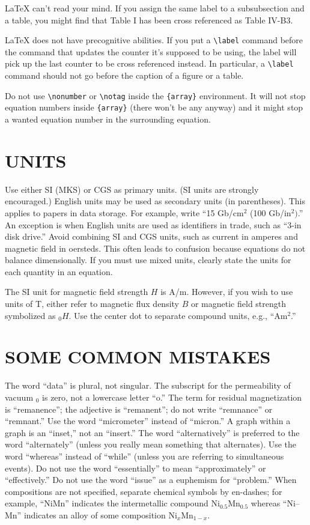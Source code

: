 \documentclass{IEEEoj}
\begin{document}
{\LaTeX} can't read your mind. If you assign the same label to a
subsubsection and a table, you might find that Table I has been cross
referenced as Table IV-B3.

{\LaTeX} does not have precognitive abilities. If you put a
\verb|\label| command before the command that updates the counter it's
supposed to be using, the label will pick up the last counter to be
cross referenced instead. In particular, a \verb|\label| command
should not go before the caption of a figure or a table.

Do not use \verb|\nonumber| or \verb|\notag| inside the \verb|{array}| environment. It
will not stop equation numbers inside \verb|{array}| (there won't be
any anyway) and it might stop a wanted equation number in the
surrounding equation.

\section{UNITS}
Use either SI (MKS) or CGS as primary units. (SI units are strongly 
encouraged.) English units may be used as secondary units (in parentheses). 
This applies to papers in data storage. For example, write ``15 Gb/cm$^{2}$ 
(100 Gb/in$^{2})$.'' An exception is when English units are used as 
identifiers in trade, such as ``3\textonehalf -in disk drive.'' Avoid 
combining SI and CGS units, such as current in amperes and magnetic field in 
oersteds. This often leads to confusion because equations do not balance 
dimensionally. If you must use mixed units, clearly state the units for each 
quantity in an equation.

The SI unit for magnetic field strength $H$ is A/m. However, if you wish to use 
units of T, either refer to magnetic flux density $B$ or magnetic field 
strength symbolized as \textmu $_{0}H$. Use the center dot to separate 
compound units, e.g., ``A\textbullet m$^{2}$.''

\section{SOME COMMON MISTAKES}
The word ``data'' is plural, not singular. The subscript for the 
permeability of vacuum \textmu $_{0}$ is zero, not a lowercase letter ``o.'' 
The term for residual magnetization is ``remanence''; the adjective is 
``remanent''; do not write ``remnance'' or ``remnant.'' Use the word 
``micrometer'' instead of ``micron.'' A graph within a graph is an 
``inset,'' not an ``insert.'' The word ``alternatively'' is preferred to the 
word ``alternately'' (unless you really mean something that alternates). Use 
the word ``whereas'' instead of ``while'' (unless you are referring to 
simultaneous events). Do not use the word ``essentially'' to mean 
``approximately'' or ``effectively.'' Do not use the word ``issue'' as a 
euphemism for ``problem.'' When compositions are not specified, separate 
chemical symbols by en-dashes; for example, ``NiMn'' indicates the 
intermetallic compound Ni$_{0.5}$Mn$_{0.5}$ whereas ``Ni--Mn'' indicates an 
alloy of some composition Ni$_{x}$Mn$_{1-x}$.
\end{document}
